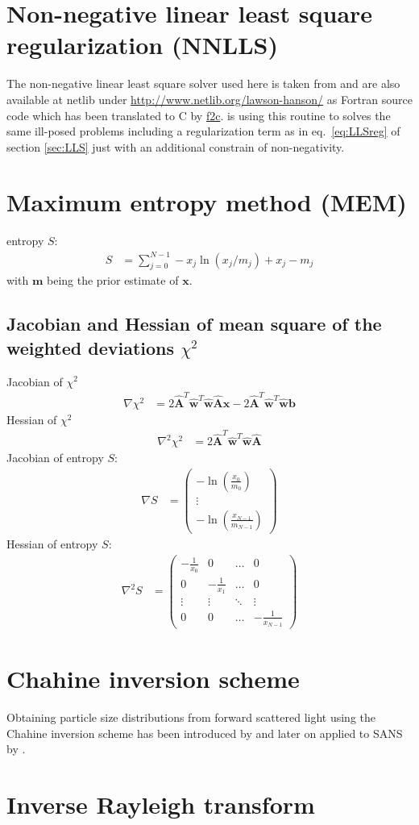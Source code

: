 \section{Non-negative linear least square regularization (NNLLS)}\label{sec:NNLLS}
The non-negative linear least square solver used here is taken from \cite{Lawson1995a} and are also available at netlib under
\url{http://www.netlib.org/lawson-hanson/} as Fortran source code which has been translated to C by \hyperref[https://www.netlib.org/f2c/]{f2c}. \SASfit is using this routine to solves the same ill-posed problems including a regularization term as in eq.\ \ref{eq:LLSreg} of section \ref{sec:LLS} just with an additional constrain of non-negativity.


\clearpage
\section{Maximum entropy method (MEM)}
entropy $S$:
\begin{align}
S&= \sum_{j=0}^{N-1} -x_j\ln\left(x_j/m_j\right) +x_j-m_j
\end{align}
with $\mathbf{m}$ being the prior estimate of $\mathbf{x}$.

\subsection{Jacobian and Hessian of mean square of the weighted deviations $\chi^2$}



Jacobian of $\chi^2$
\begin{align}
  \nabla \chi^2 &= 2\hat{\mathbf{A}}^T\hat{\mathbf{w}}^T\hat{\mathbf{w}}\hat{\mathbf{A}}\mathbf{x}-2\hat{\mathbf{A}}^T\hat{\mathbf{w}}^T\hat{\mathbf{w}}\mathbf{b}
\end{align}
Hessian of $\chi^2$
\begin{align}
  \nabla^2 \chi^2 &= 2\hat{\mathbf{A}}^T\hat{\mathbf{w}}^T\hat{\mathbf{w}}\hat{\mathbf{A}}
\end{align}
Jacobian of entropy $S$:
\begin{align}
  \nabla  S &= \begin{pmatrix}
    -\ln \left(\frac{x_0}{m_0}\right) \\
   \vdots \\
    -\ln \left(\frac{x_{N-1}}{m_{N-1}}\right)
  \end{pmatrix}
\end{align}
Hessian of entropy $S$:
\begin{align}
  \nabla^2  S &=
  \begin{pmatrix}
    -\frac{1}{x_0} & 0 & \dots & 0 \\
    0 & -\frac{1}{x_1} & \dots & 0 \\
    \vdots & \vdots & \ddots & \vdots \\
    0 & 0 & \dots & -\frac{1}{x_{N-1}}
  \end{pmatrix}
\end{align}
\section{Chahine inversion scheme}
Obtaining particle size distributions from forward scattered light using the Chahine inversion scheme has been introduced by \cite{Santer1983} and later on applied to SANS by \cite{Sen2014}.

\section{Inverse Rayleigh transform} 